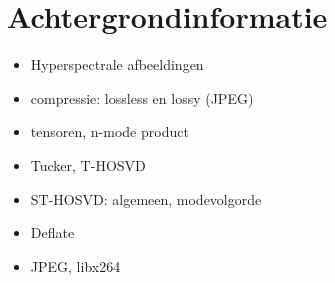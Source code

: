 \chapter{Achtergrondinformatie}
\label{hoofdstuk:achtergrond}

\begin{itemize}
\item Hyperspectrale afbeeldingen
\item compressie: lossless en lossy (JPEG)
\item tensoren, n-mode product
\item Tucker, T-HOSVD
\item ST-HOSVD: algemeen, modevolgorde
\item Deflate
\item JPEG, libx264
\end{itemize}
